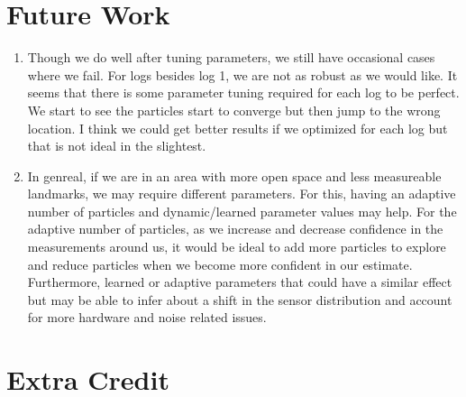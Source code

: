 \documentclass[12pt, a4paper]{article}
\begin{document}
\section{Future Work}
\begin{enumerate}
  \item Though we do well after tuning parameters, we still have occasional cases where we fail. For logs besides log 1, we are not as robust as we would like. It seems that there is some parameter tuning required for each log to be perfect. We start to see the particles start to converge but then jump to the wrong location. I think we could get better results if we optimized for each log but that is not ideal in the slightest.
  \item In genreal, if we are in an area with more open space and less measureable landmarks, we may require different parameters. For this, having an adaptive number of particles and dynamic/learned parameter values may help. For the adaptive number of particles, as we increase and decrease confidence in the measurements around us, it would be ideal to add more particles to explore and reduce particles when we become more confident in our estimate. Furthermore, learned or adaptive parameters that could have a similar effect but may be able to infer about a shift in the sensor distribution and account for more hardware and noise related issues.
\end{enumerate}




\section{Extra Credit}
\end{document}
